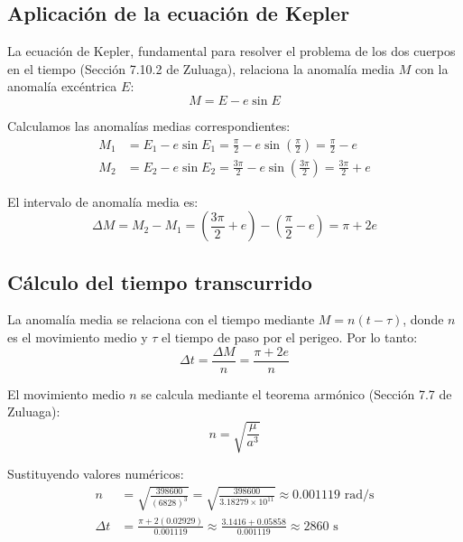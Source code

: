 \documentclass[12pt, a4paper]{article}
\begin{document}
\subsection*{Aplicación de la ecuación de Kepler}

La ecuación de Kepler, fundamental para resolver el problema de los dos cuerpos en el tiempo (Sección 7.10.2 de Zuluaga), relaciona la anomalía media $M$ con la anomalía excéntrica $E$:
\begin{equation}
    M = E - e\sin E
\end{equation}

Calculamos las anomalías medias correspondientes:
\begin{align}
    M_1 &= E_1 - e\sin E_1 = \frac{\pi}{2} - e\sin\left(\frac{\pi}{2}\right) = \frac{\pi}{2} - e \\
    M_2 &= E_2 - e\sin E_2 = \frac{3\pi}{2} - e\sin\left(\frac{3\pi}{2}\right) = \frac{3\pi}{2} + e
\end{align}

El intervalo de anomalía media es:
\begin{equation}
    \Delta M = M_2 - M_1 = \left(\frac{3\pi}{2} + e\right) - \left(\frac{\pi}{2} - e\right) = \pi + 2e
\end{equation}

\subsection*{Cálculo del tiempo transcurrido}

La anomalía media se relaciona con el tiempo mediante $M = n(t - \tau)$, donde $n$ es el movimiento medio y $\tau$ el tiempo de paso por el perigeo. Por lo tanto:
\begin{equation}
    \Delta t = \frac{\Delta M}{n} = \frac{\pi + 2e}{n}
\end{equation}

El movimiento medio $n$ se calcula mediante el teorema armónico (Sección 7.7 de Zuluaga):
\begin{equation}
    n = \sqrt{\frac{\mu}{a^3}}
\end{equation}

Sustituyendo valores numéricos:
\begin{align}
    n &= \sqrt{\frac{398600}{(6828)^3}} = \sqrt{\frac{398600}{3.18279 \times 10^{11}}} \approx 0.001119 \text{ rad/s} \\
    \Delta t &= \frac{\pi + 2(0.02929)}{0.001119} \approx \frac{3.1416 + 0.05858}{0.001119} \approx 2860 \text{ s}
\end{align}
\end{document}
